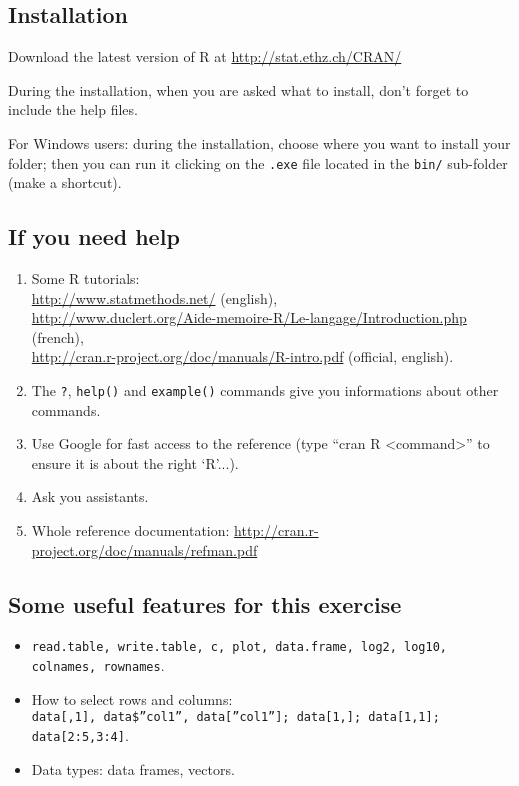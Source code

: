 \documentclass[a4paper,11pt]{article}
\begin{document}
\subsection{Installation}
Download the latest version of R at \url{http://stat.ethz.ch/CRAN/}

During the installation, when you are asked what to install, don't forget to include the help files.

For Windows users: during the installation, choose where you want to install your folder; then you can run it clicking on the \texttt{.exe} file located in the \texttt{bin/} sub-folder (make a shortcut).

\subsection{If you need help}
\begin{enumerate}
\item Some R tutorials: \\
      \url{http://www.statmethods.net/} (english),\\
      \url{http://www.duclert.org/Aide-memoire-R/Le-langage/Introduction.php} (french), \\
      \url{http://cran.r-project.org/doc/manuals/R-intro.pdf} (official, english).
\item The \texttt{?}, \texttt{help()} and \texttt{example()} commands give you informations about other commands.
\item Use Google for fast access to the reference (type ``cran R <command>'' to ensure it is about the right `R'...).
\item Ask you assistants.
\item Whole reference documentation: \url{http://cran.r-project.org/doc/manuals/refman.pdf}
\end{enumerate}

\subsection{Some useful features for this exercise}
\begin{itemize}
\item \texttt{read.table, write.table, c, plot, data.frame, log2, log10, colnames, rownames}.
\item How to select rows and columns:\\ \texttt{data[,1], data\$''col1'', data[''col1'']; data[1,]; data[1,1]; data[2:5,3:4]}.
\item Data types: data frames, vectors.
\end{itemize}
\end{document}
